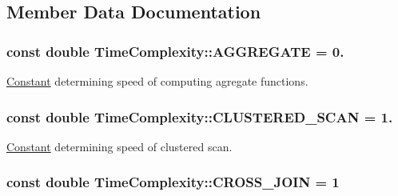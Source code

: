 \subsection{Member Data Documentation}
\hypertarget{class_time_complexity_a9bb16133f1284faf24bd901d8947b896}{
\subsubsection[{A\+G\+G\+R\+E\+G\+A\+T\+E}]{\setlength{\rightskip}{0pt plus 5cm}const double Time\+Complexity\+::\+A\+G\+G\+R\+E\+G\+A\+T\+E = 0.\hspace{0.3cm}{\ttfamily [static]}}}\label{class_time_complexity_a9bb16133f1284faf24bd901d8947b896}
\hyperlink{class_constant}{Constant} determining speed of computing agregate functions. \hypertarget{class_time_complexity_a5d917c41e7784cc85a29650ea9e54db2}{
\subsubsection[{C\+L\+U\+S\+T\+E\+R\+E\+D\+\_\+\+S\+C\+A\+N}]{\setlength{\rightskip}{0pt plus 5cm}const double Time\+Complexity\+::\+C\+L\+U\+S\+T\+E\+R\+E\+D\+\_\+\+S\+C\+A\+N = 1.\hspace{0.3cm}{\ttfamily [static]}}}\label{class_time_complexity_a5d917c41e7784cc85a29650ea9e54db2}
\hyperlink{class_constant}{Constant} determining speed of clustered scan. \hypertarget{class_time_complexity_afe17c2e0735b25c3fe8df95d00affc91}{
\subsubsection[{C\+R\+O\+S\+S\+\_\+\+J\+O\+I\+N}]{\setlength{\rightskip}{0pt plus 5cm}const double Time\+Complexity\+::\+C\+R\+O\+S\+S\+\_\+\+J\+O\+I\+N = 1\hspace{0.3cm}{\ttfamily [static]}}}\label{class_time_complexity_afe17c2e0735b25c3fe8df95d00affc91}
